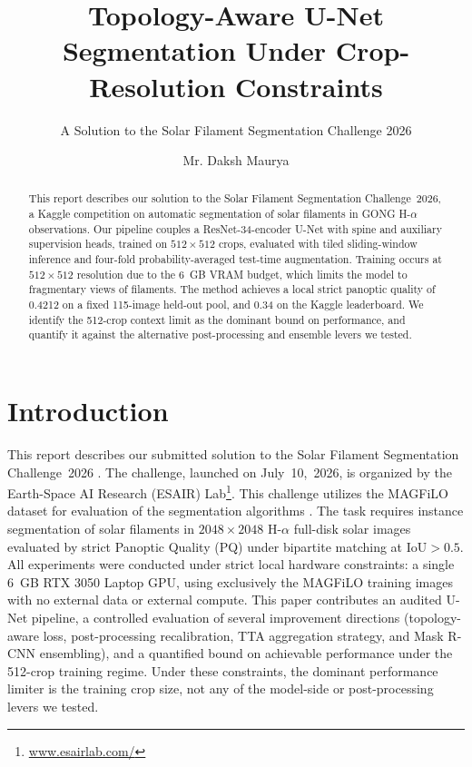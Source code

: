 \documentclass[sigconf]{acmart}
\begin{document}
\title{Topology-Aware U-Net Segmentation Under Crop-Resolution Constraints}
\subtitle{A Solution to the Solar Filament Segmentation Challenge 2026} %

\author{Mr. Daksh Maurya}

\begin{abstract}
    This report describes our solution to the Solar Filament Segmentation Challenge~2026, a Kaggle competition on automatic segmentation of solar filaments in GONG H-$\alpha$ observations. Our pipeline couples a ResNet-34-encoder U-Net with spine and auxiliary supervision heads, trained on $512\times512$ crops, evaluated with tiled sliding-window inference and four-fold probability-averaged test-time augmentation. Training occurs at $512\times512$ resolution due to the 6~GB VRAM budget, which limits the model to fragmentary views of filaments. The method achieves a local strict panoptic quality of 0.4212 on a fixed 115-image held-out pool, and 0.34 on the Kaggle leaderboard. We identify the 512-crop context limit as the dominant bound on performance, and quantify it against the alternative post-processing and ensemble levers we tested.
\end{abstract}

\maketitle

\section{Introduction}
    This report describes our submitted solution to the Solar Filament Segmentation Challenge~2026 \cite{filament-segmentation-2026}. The challenge, launched on July~10,~2026, is organized by the Earth-Space AI Research (ESAIR) Lab\footnote{\href{https://www.esairlab.com/home}{www.esairlab.com/}}. This challenge utilizes the MAGFiLO dataset for evaluation of the segmentation algorithms \cite{ahmadzadeh2024dataset}. The task requires instance segmentation of solar filaments in $2048\times2048$ H-$\alpha$ full-disk solar images evaluated by strict Panoptic Quality (PQ) under bipartite matching at $\text{IoU}>0.5$. All experiments were conducted under strict local hardware constraints: a single 6~GB RTX 3050 Laptop GPU, using exclusively the MAGFiLO training images with no external data or external compute. This paper contributes an audited U-Net pipeline, a controlled evaluation of several improvement directions (topology-aware loss, post-processing recalibration, TTA aggregation strategy, and Mask R-CNN ensembling), and a quantified bound on achievable performance under the 512-crop training regime. Under these constraints, the dominant performance limiter is the training crop size, not any of the model-side or post-processing levers we tested.
\end{document}
